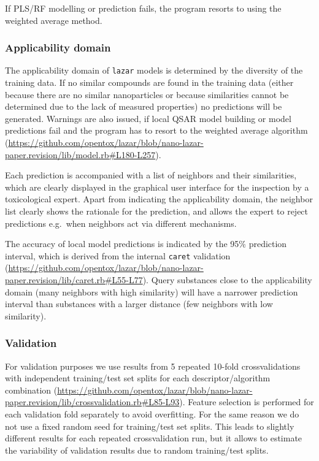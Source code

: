 \documentclass[utf8]{frontiersHLTH} %
\begin{document}
If PLS/RF modelling or prediction fails, the program resorts to using
the weighted average method.

\subsubsection{Applicability domain}\label{applicability-domain}

The applicability domain of \texttt{lazar} models is determined by the
diversity of the training data. If no similar compounds are found in the
training data (either because there are no similar nanoparticles or
because similarities cannot be determined due to the lack of measured
properties) no predictions will be generated. Warnings are also issued,
if local QSAR model building or model predictions fail and the program
has to resort to the weighted average algorithm
(\url{https://github.com/opentox/lazar/blob/nano-lazar-paper.revision/lib/model.rb\#L180-L257}).

Each prediction is accompanied with a list of neighbors and their
similarities, which are clearly displayed in the graphical user
interface for the inspection by a toxicological expert. Apart from
indicating the applicability domain, the neighbor list clearly shows the
rationale for the prediction, and allows the expert to reject
predictions e.g.~when neighbors act via different mechanisms.

The accuracy of local model predictions is indicated by the 95\%
prediction interval, which is derived from the internal \texttt{caret}
validation
(\url{https://github.com/opentox/lazar/blob/nano-lazar-paper.revision/lib/caret.rb\#L55-L77}).
Query substances close to the applicability domain (many neighbors with
high similarity) will have a narrower prediction interval than
substances with a larger distance (few neighbors with low similarity).

\subsubsection{Validation}\label{validation}

For validation purposes we use results from 5 repeated 10-fold
crossvalidations with independent training/test set splits for each
descriptor/algorithm combination
(\url{https://github.com/opentox/lazar/blob/nano-lazar-paper.revision/lib/crossvalidation.rb\#L85-L93}).
Feature selection is performed for each validation fold separately to
avoid overfitting. For the same reason we do not use a fixed random seed
for training/test set splits. This leads to slightly different results
for each repeated crossvalidation run, but it allows to estimate the
variability of validation results due to random training/test splits.
\end{document}
